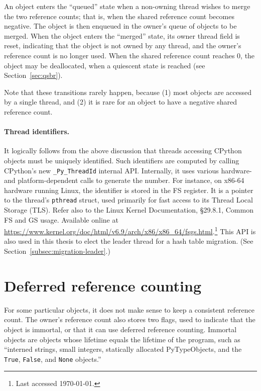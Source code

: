 An object enters the ``queued'' state when a non-owning thread wishes to merge the two reference counts; that is, when the shared reference count becomes negative.
The object is then enqueued in the owner's queue of objects to be merged.
When the object enters the ``merged'' state, its owner thread field is reset, indicating that the object is not owned by any thread, and the owner's reference count is no longer used.
When the shared reference count reaches 0, the object may be deallocated, when a quiescent state is reached (see Section~\ref{sec:qsbr}).

Note that these transitions rarely happen, because (1) most objects are accessed by a single thread, and (2) it is rare for an object to have a negative shared reference count.


\paragraph{Thread identifiers.}
It logically follows from the above discussion that threads accessing CPython objects must be uniquely identified.
Such identifiers are computed by calling CPython's new \texttt{\_Py\_ThreadId} internal API\@.
Internally, it uses various hardware- and platform-dependent calls to generate the number.
For instance, on x86-64 hardware running Linux, the identifier is stored in the FS register.
It is a pointer to the thread's \texttt{pthread} struct, used primarily for fast access to its Thread Local Storage (TLS).
Refer also to the Linux Kernel Documentation, \S29.8.1, Common FS and GS usage.
Available online at \url{https://www.kernel.org/doc/html/v6.9/arch/x86/x86_64/fsgs.html}.\footnote{Last accessed \today.}
This API is also used in this thesis to elect the leader thread for a hash table migration.
(See Section~\ref{subsec:migration-leader}.)


\section{Deferred reference counting}\label{sec:deferred-reference-counting}

For some particular objects, it does not make sense to keep a consistent reference count.
The owner's reference count also stores two flags, used to indicate that the object is immortal, or that it can use deferred reference counting.
Immortal objects are objects whose lifetime equals the lifetime of the program, such as ``interned strings, small integers, statically allocated PyTypeObjects, and the \texttt{True}, \texttt{False}, and \texttt{None} objects.''

